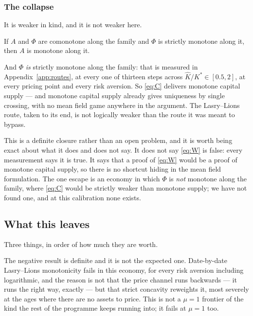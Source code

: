 \subsubsection*{The collapse}

It is weaker in kind, and it is not weaker here.

\begin{proposition}\label{prop:collapse}
If $A$ and $\Phi$ are comonotone along the family and $\Phi$ is strictly monotone along it, then
$A$ is monotone along it.
\end{proposition}

And $\Phi$ \emph{is} strictly monotone along the family: that is measured in
Appendix~\ref{app:routes}, at every one of thirteen steps across $\hat K/K^*\in[0.5,2]$, at every
pricing point and every risk aversion. So \eqref{eq:C} delivers monotone capital supply --- and
monotone capital supply already gives uniqueness by single crossing, with no mean field game
anywhere in the argument. The Lasry--Lions route, taken to its end, is not logically weaker than the
route it was meant to bypass.

This is a definite closure rather than an open problem, and it is worth being exact about what it
does and does not say. It does not say \eqref{eq:W} is false: every measurement says it is true. It
says that a proof of \eqref{eq:W} would be a proof of monotone capital supply, so there is no
shortcut hiding in the mean field formulation. The one escape is an economy in which $\Phi$ is
\emph{not} monotone along the family, where \eqref{eq:C} would be strictly weaker than monotone
supply; we have not found one, and at this calibration none exists.

\subsection{What this leaves}

Three things, in order of how much they are worth.

The negative result is definite and it is not the expected one. Date-by-date Lasry--Lions
monotonicity fails in this economy, for every risk aversion including logarithmic, and the reason
is not that the price channel runs backwards --- it runs the right way, exactly --- but that
strict concavity reweights it, most severely at the ages where there are no assets to price. This
is not a $\mu=1$ frontier of the kind the rest of the programme keeps running into; it fails at
$\mu=1$ too.


